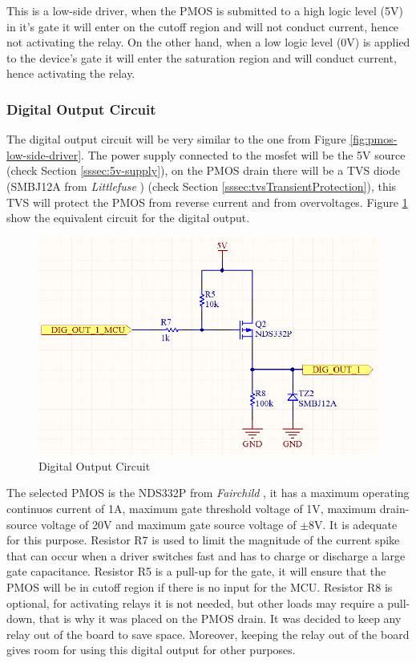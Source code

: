 			This is a low-side driver, when the PMOS is submitted to a high logic level (5V) in it's gate it will enter on the cutoff region and will not conduct current, hence not activating the relay. On the other hand, when a low logic level (0V) is applied to the device's gate it will enter the saturation region and will conduct current, hence activating the relay.

		\subsubsection{Digital Output Circuit}\label{sssec:digital-output-circuit}

			The digital output circuit will be very similar to the one from Figure \ref{fig:pmos-low-side-driver}. The power supply connected to the mosfet will be the 5V source (check Section \ref{sssec:5v-supply}), on the PMOS drain there will be a TVS diode (SMBJ12A from \textit{Littlefuse} \cite{smbj12a-datasheet}) (check Section \ref{sssec:tvsTransientProtection}), this TVS will protect the PMOS from reverse current and from overvoltages. Figure \ref{fig:digital-output-circuit} show the equivalent circuit for the digital output.

			\begin{figure}[htbp]
				\centering
				\includegraphics[scale=1.2]{figuras/fig-digital-output-circuit.png}
				\caption{Digital Output Circuit}
				\label{fig:digital-output-circuit}
			\end{figure}

			The selected PMOS is the NDS332P from \textit{Fairchild} \cite{nds332p-datasheet}, it has a maximum operating continuos current of 1A, maximum gate threshold voltage of 1V, maximum drain-source voltage of 20V and maximum gate source voltage of $\pm$8V. It is adequate for this purpose. Resistor R7 is used to limit the magnitude of the current spike that can occur when a driver switches fast and has to charge or discharge a large gate capacitance. Resistor R5 is a pull-up for the gate, it will ensure that the PMOS will be in cutoff region if there is no input for the MCU. Resistor R8 is optional, for activating relays it is not needed, but other loads may require a pull-down, that is why it was placed on the PMOS drain. It was decided to keep any relay out of the board to save space. Moreover, keeping the relay out of the board gives room for using this digital output for other purposes.

